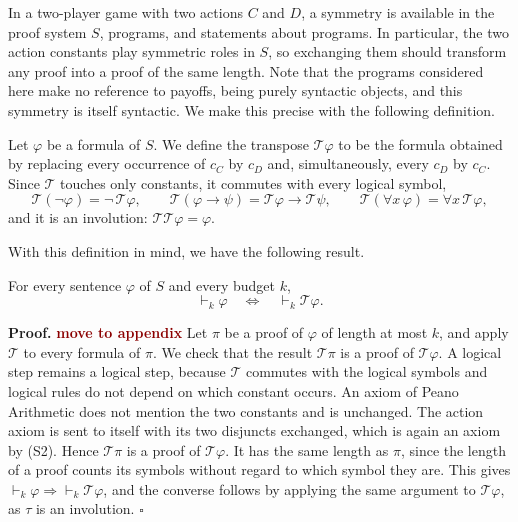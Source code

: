 \documentclass[twoside,11pt]{article}
\renewcommand{\BlackBox}{\ensuremath{\square}}
\renewenvironment{proof}[1][Proof]{%
  \par\noindent\textbf{#1.}\enspace\ignorespaces
}{%
  \ifhmode\unskip\nobreak\hfill\quad\else\noindent\hfill\fi
  \BlackBox\par\addvspace{2mm}%
}
\newcommand{\boldred}[1]{\textbf{\textcolor{darkred}{#1}}}
\begin{document}
In a two-player game with two actions $C$ and $D$, a symmetry is available in the proof system $S$, programs, and statements about programs. In particular, the two action constants play symmetric roles in $S$, so exchanging them should transform any proof into a proof of the same length. Note that the programs considered here make no reference to payoffs, being purely syntactic objects, and this symmetry is itself syntactic. We make this precise with the following definition.

\begin{definition}
Let $\varphi$ be a formula of $S$. We define the transpose $\mathcal{T}\varphi$ to be the formula obtained by replacing every occurrence of $c_C$ by $c_D$ and, simultaneously, every $c_D$ by $c_C$. Since $\mathcal{T}$ touches only constants, it commutes with every logical symbol,
\[
  \mathcal{T}(\neg\varphi)=\neg\,\mathcal{T}\varphi,\qquad
  \mathcal{T}(\varphi\to\psi)=\mathcal{T}\varphi\to\mathcal{T}\psi,\qquad
  \mathcal{T}(\forall x\,\varphi)=\forall x\,\mathcal{T}\varphi,
\]
and it is an involution: $\mathcal{T}\mathcal{T}\varphi = \varphi$.
\end{definition}

With this definition in mind, we have the following result.

\begin{theorem}\label{thm:transposition}
For every sentence $\varphi$ of $S$ and every budget $k$,
\[
  \vdash_k \varphi \quad\Longleftrightarrow\quad \vdash_k \mathcal{T}\varphi .
\]
\end{theorem}
\begin{proof}\boldred{move to appendix}
Let $\pi$ be a proof of $\varphi$ of length at most $k$, and apply $\mathcal{T}$ to every formula of $\pi$. We check that the result $\mathcal{T}\pi$ is a proof of $\mathcal{T}\varphi$. A logical step remains a logical step, because $\mathcal{T}$ commutes with the logical symbols and logical rules do not depend on which constant occurs. An axiom of Peano Arithmetic does not mention the two constants and is unchanged. The action axiom is sent to itself with its two disjuncts exchanged, which is again an axiom by (S2). Hence $\mathcal{T}\pi$ is a proof of $\mathcal{T}\varphi$. It has the same length as $\pi$, since the length of a proof counts its symbols without regard to which symbol they are. This gives $\vdash_k\varphi \Rightarrow \vdash_k\mathcal{T}\varphi$, and the converse follows by applying the same argument to $\mathcal{T}\varphi$, as $\tau$ is an involution.
\end{proof}
\end{document}
